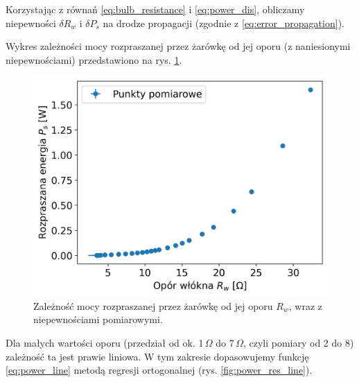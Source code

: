 \documentclass[12pt]{article}
\begin{document}
Korzystając z równań \eqref{eq:bulb_resistance} i \eqref{eq:power_dis}, obliczamy niepewności $\delta R_w$ i $\delta P_s$ na drodze propagacji (zgodnie z \eqref{eq:error_propagation}).

\newpage

Wykres zależności mocy rozpraszanej przez żarówkę od jej oporu (z naniesionymi niepewnościami) przedstawiono na rys. \ref{fig:power_res_full}.
\begin{figure}[H]
    \centering
    \includegraphics[scale=0.58]{pomiary_moc}
    \caption{Zależność mocy rozpraszanej przez żarówkę od jej oporu $R_w$, wraz z niepewnościami pomiarowymi.}
    \label{fig:power_res_full}
\end{figure}

Dla małych wartości oporu (przedział od ok. 1\,\(\Omega\) do 7\,\(\Omega\), czyli pomiary od 2 do 8) zależność ta jest prawie liniowa. W tym zakresie dopasowujemy funkcję \eqref{eq:power_line} metodą regresji ortogonalnej (rys. \ref{fig:power_res_line}).
\end{document}
